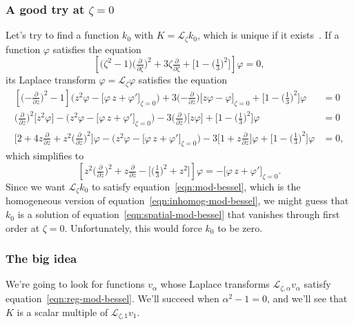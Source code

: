 \documentclass{article}
\theoremstyle{plain}
\newcommand{\laplace}{\mathcal{L}}
\begin{document}
\subsubsection{A good try at $\zeta = 0$}
Let's try to find a function $k_0$ with $K = \laplace_\zeta k_0$, which is unique if it exists~\cite[Theorem~1.23]{laplace-tfm}. If a function $\varphi$ satisfies the equation
\begin{equation}%
\left[\big(\zeta^2 - 1\big) \big(\tfrac{\partial}{\partial \zeta}\big)^2 + 3\zeta \tfrac{\partial}{\partial \zeta} + \big[1 - \big(\tfrac{1}{3}\big)^2\big]\right] \varphi = 0,
\end{equation}
its Laplace transform $\varphi = \laplace_\zeta \varphi$ satisfies the equation
\begin{align*}
\left[\big({-\tfrac{\partial}{\partial z}}\big)^2 - 1\right] \Big(z^2 \varphi - \big[\varphi\,z + \varphi'\big]_{\zeta = 0}\Big) + 3\big({-\tfrac{\partial}{\partial z}}\big)\big[z\varphi - \varphi\big]_{\zeta = 0} + \big[1 - \big(\tfrac{1}{3}\big)^2\big] \varphi & = 0 \\
\big(\tfrac{\partial}{\partial z}\big)^2 \big[z^2 \varphi\big] - \Big(z^2 \varphi - \big[\varphi\,z + \varphi'\big]_{\zeta = 0}\Big) - 3\big(\tfrac{\partial}{\partial z}\big)\big[z\varphi\big] + \big[1 - \big(\tfrac{1}{3}\big)^2\big] \varphi & = 0 \\
\Big[2 + 4z\tfrac{\partial}{\partial z} + z^2\big(\tfrac{\partial}{\partial z}\big)^2\Big]\varphi - \Big(z^2 \varphi - \big[\varphi\,z + \varphi'\big]_{\zeta = 0}\Big) - 3\Big[1 + z\tfrac{\partial}{\partial z}\Big]\varphi + \big[1 - \big(\tfrac{1}{3}\big)^2\big] \varphi & = 0,
\end{align*}
which simplifies to
\begin{equation}\label{eqn:inhomog-mod-bessel}
\left[z^2 \big(\tfrac{\partial}{\partial z}\big)^2 + z \tfrac{\partial}{\partial z} - \big[\big(\tfrac{1}{3}\big)^2 + z^2\big]\right] \varphi = -\big[\varphi\,z + \varphi'\big]_{\zeta = 0}.
\end{equation}
Since we want $\laplace_\zeta k_0$ to satisfy equation~\ref{eqn:mod-bessel}, which is the homogeneous version of equation~\ref{eqn:inhomog-mod-bessel}, we might guess that $k_0$ is a solution of equation~\ref{eqn:spatial-mod-bessel} that vanishes through first order at $\zeta = 0$. Unfortunately, this would force $k_0$ to be zero.
\color{black}
\subsubsection{The big idea}\label{big-idea}
We're going to look for functions $v_\alpha$ whose Laplace transforms $\laplace_{\zeta, \alpha} v_\alpha$ satisfy equation~\ref{eqn:reg-mod-bessel}. We'll succeed when $\alpha^2 - 1 = 0$, and we'll see that $K$ is a scalar multiple of $\laplace_{\zeta, 1} v_1$.
\end{document}
